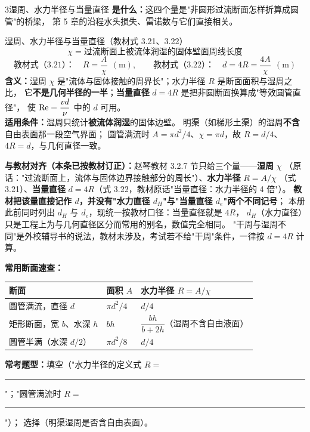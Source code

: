 \begin{kaodian}{3}{湿周、水力半径与当量直径}
\textbf{是什么：}这四个量是"非圆形过流断面怎样折算成圆管"的桥梁，
第 5 章的沿程水头损失、雷诺数与它们直接相关。

\begin{gongshi}{湿周、水力半径与当量直径（教材式 3.21、3.22）}
\[ \chi=\text{过流断面上被流体润湿的固体壁面周线长度} \]
\[ \text{教材式（3.21）：}\quad R=\frac{A}{\chi}\ \ (\mathrm{m}),\qquad
   \text{教材式（3.22）：}\quad d=4R=\frac{4A}{\chi}\ \ (\mathrm{m}) \]
\textbf{含义：}湿周 $\chi$ 是"流体与固体接触的周界长"；水力半径 $R$ 是断面面积与湿周之比，
它\textbf{不是几何半径的一半}；\textbf{当量直径} $d=4R$ 是把非圆断面换算成"等效圆管直径"，
使 $\mathrm{Re}=\dfrac{vd}{\nu}$ 中的 $d$ 可用。\\
\textbf{适用条件：}湿周只统计\textbf{被流体润湿}的固体边壁。
明渠（如梯形土渠）的湿周\textbf{不含}自由表面那一段空气界面；
圆管满流时 $A=\pi d^2/4$、$\chi=\pi d$，故 $R=d/4$、$4R=d$，与几何直径一致。
\end{gongshi}

\begin{tishi}
\textbf{与教材对齐（本条已按教材订正）：}赵琴教材 3.2.7 节只给三个量——\textbf{湿周} $\chi$
（原话："过流断面上，流体与固体边界接触部分的周长"）、\textbf{水力半径} $R=A/\chi$
（式 3.21）、\textbf{当量直径} $d=4R$（式 3.22，教材原话"当量直径：水力半径的 4 倍"）。
\textbf{教材把该量直接记作 $d$，并没有"水力直径 $d_H$"与"当量直径 $d_e$"两个不同记号}；
本册此前同时列出 $d_H$ 与 $d_e$，现统一按教材口径：当量直径就是 $4R$，
$d_H$（水力直径）只是工程上为与几何直径区分而常用的别名，数值完全相同。
"干周与湿周不同"是外校辅导书的说法，教材未涉及，考试若不给"干周"条件，一律按 $d=4R$ 计算。
\end{tishi}

\textbf{常用断面速查：}
\begin{center}
\begin{tabularx}{\textwidth}{@{}lXX@{}}
\toprule
断面 & 面积 $A$ & 水力半径 $R=A/\chi$ \\
\midrule
圆管满流，直径 $d$ & $\pi d^2/4$ & $d/4$ \\
矩形断面，宽 $b$、水深 $h$ & $bh$ & $\dfrac{bh}{b+2h}$（湿周不含自由液面） \\
圆管半满（水深 $d/2$） & $\pi d^2/8$ & $d/4$ \\
\bottomrule
\end{tabularx}
\end{center}

\textbf{常考题型：}填空（"水力半径的定义式 $R=$ \rule{2cm}{0.4pt}"；"圆管满流时 $R=$ \rule{2cm}{0.4pt}"）；
选择（明渠湿周是否含自由表面）。


\end{kaodian}
